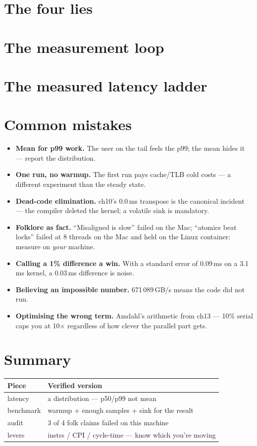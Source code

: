 \section{The four lies}


\section{The measurement loop}


\section{The measured latency ladder}


\section{Common mistakes}
\begin{itemize}
\item \textbf{Mean for p99 work.} The user on the tail feels the
      p99; the mean hides it --- report the distribution.
\item \textbf{One run, no warmup.} The first run pays cache/TLB
      cold costs --- a different experiment than the steady state.
\item \textbf{Dead-code elimination.} ch10's 0.0\,ms transpose is
      the canonical incident --- the compiler deleted the kernel;
      a volatile sink is mandatory.
\item \textbf{Folklore as fact.} ``Misaligned is slow'' failed on
      the Mac; ``atomics beat locks'' failed at 8 threads on the Mac
      and held on the Linux container; measure on \emph{your}
      machine.
\item \textbf{Calling a 1\% difference a win.} With a standard
      error of 0.09\,ms on a 3.1\,ms kernel, a 0.03\,ms difference is
      noise.
\item \textbf{Believing an impossible number.} 671\,089\,GB/s means
      the code did not run.
\item \textbf{Optimising the wrong term.} Amdahl's arithmetic from
      ch13 --- 10\% serial caps you at 10$\times$ regardless of
      how clever the parallel part gets.
\end{itemize}

\section{Summary}
\begin{tabularx}{\linewidth}{@{}l X@{}}
\toprule
\textbf{Piece} & \textbf{Verified version} \\
\midrule
latency & a distribution --- p50/p99 not mean \\
benchmark & warmup + enough samples + sink for the result \\
audit & 3 of 4 folk claims failed on this machine \\
levers & instrs / CPI / cycle-time --- know which you're moving \\
\bottomrule
\end{tabularx}

